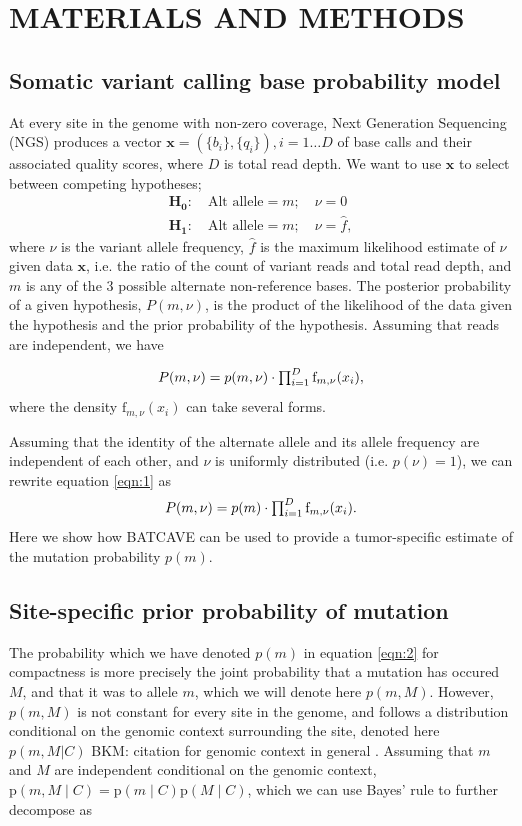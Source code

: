 \documentclass[a4,center,fleqn]{NAR}
\newcommand{\bkmcomment}[1]{{\color{blue}BKM: #1}}
\newcommand{\batcave}{BATCAVE }
\begin{document}
\section{MATERIALS AND METHODS}
\subsection{Somatic variant calling base probability model}

At every site in the genome with non-zero coverage, Next Generation Sequencing (NGS) produces a vector $\mathbf{x}  = (\{b_i\},\{q_i\}), i = 1\dots D$ of base calls and their associated quality scores, where $D$ is total read depth.
We want to use $\mathbf{x}$ to select between competing hypotheses;
$$
  \begin{array}{l}
    \mathbf{H_0}:\quad \textrm{Alt allele} = m;\quad\nu = 0\\
    \mathbf{H_1}:\quad \textrm{Alt allele} = m;\quad\nu = \hat{f},
  \end{array}
$$
where $\nu$ is the variant allele frequency, $\hat{f}$ is the maximum likelihood estimate of $\nu$ given data $\mathbf{x}$, i.e. the ratio of the count of variant reads and total read depth, and $m$ is any of the 3 possible alternate non-reference bases.
The posterior probability of a given hypothesis, $P(m,\nu)$, is the product of the likelihood of the data given the hypothesis and the prior probability of the hypothesis. 
Assuming that reads are independent, we have

\begin{equation}
  \label{eqn:1}
$$
  P(m,\nu) = p(m,\nu) \cdot \prod_{i=1}^{D} \textrm{f}_{m,\nu}(x_i),
$$
\end{equation}
where the density $\textrm{f}_{m,\nu}(x_i)$ can take several forms.

Assuming that the identity of the alternate allele and its allele frequency are independent of each other, and $\nu$ is uniformly distributed (i.e. $p(\nu) = 1$), we can rewrite equation \ref{eqn:1} as
\begin{equation}
  \label{eqn:2}
$$
  P(m,\nu) = p(m) \cdot \prod_{i=1}^{D} \textrm{f}_{m,\nu}(x_i).
$$
\end{equation}
Here we show how \batcave can be used to provide a tumor-specific estimate of the mutation probability $p(m)$.

\subsection{Site-specific prior probability of mutation}
The probability which we have denoted $p(m)$ in equation \ref{eqn:2} for compactness is more precisely the joint probability that a mutation has occured $M$, and that it was to allele $m$, which we will denote here $p(m,M)$.
However, $p(m,M)$ is not constant for every site in the genome, and follows a distribution conditional on the genomic context surrounding the site, denoted here $p(m,M | C)$ \bkmcomment{citation for genomic context in general} .
Assuming that $m$ and $M$ are independent conditional on the genomic context, $\mathrm{p}(m,M \mid C) = \mathrm{p}(m \mid C) \mathrm{p}(M \mid C)$, which we can use Bayes' rule to further decompose as 
\end{document}
